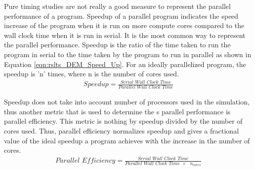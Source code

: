 \documentclass[preprint,11pt,authoryear]{elsarticle}
\begin{document}
Pure timing studies are not really a good measure to represent the parallel performance of a program. 
Speedup of a parallel program indicates the speed increase of the program when it is run on more 
compute cores compared to the wall clock time when it is run in serial. It is the most common way to 
represent the parallel performance. Speedup is the ratio of the time taken to run the program in serial 
to the time taken by the program to run in parallel as shown in Equation \ref{eqn:rslts_DEM_Speed_Up}. 
For an ideally parallelized program, the speedup is 'n' times, where n is the number of cores used.\\

\begin{align}
\textit{Speedup} = \frac{\textit{Serial Wall Clock Time}}{\textit{Parallel Wall Clock Time}}
\label{eqn:rslts_DEM_Speed_Up}
\end{align}

Speedup does not take into account number of processors used in the simulation, thus another metric 
that is used to determine the s parallel performance is parallel efficiency. This metric is nothing by 
speedup divided by the number of cores used. Thus, parallel efficiency normalizes speedup and gives 
a fractional value of the ideal speedup a program achieves with the increase in the number of cores.\\

\begin{align}
\textit{Parallel Efficiency} = \frac{\textit{Serial Wall Clock Time}}{\textit{Parallel Wall Clock Time $\times$ $n_{cores}$}}
\label{eqn:rslts_DEM_parallel_efficiency}
\end{align}
\end{document}

